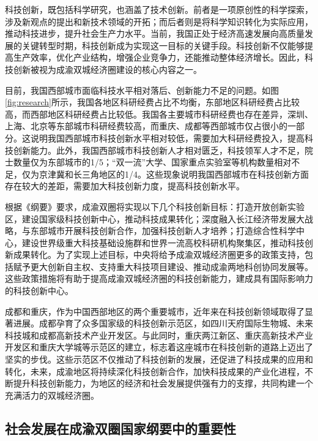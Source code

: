 \documentclass{CjC}
\begin{document}
科技创新，既包括科学研究，也涵盖了技术创新。前者是一项原创性的科学探索，涉及新观点的提出和新技术领域的开拓；而后者则是将科学知识转化为实际应用，推动科技进步，提升社会生产力水平。当前，我国正处于经济高速发展向高质量发展的关键转型时期，科技创新成为实现这一目标的关键手段。科技创新不仅能够提高生产效率，优化产业结构，增强企业竞争力，还能推动整体经济增长。因此，科技创新被视为成渝双城经济圈建设的核心内容之一。

目前，我国西部城市面临科技水平相对落后、创新能力不足的问题\cite{游光荣2001我国地区科技竞争力研究,郭新艳2004基于}。如图\ref{fig:research}所示，我国各地区科研经费占比不均衡，东部地区科研经费占比较高，而西部地区科研经费占比较低。我国各主要城市科研经费也存在差异，深圳、上海、北京等东部城市科研经费较高，而重庆、成都等西部城市仅占很小的一部分。这说明我国西部城市科技创新水平相对较低，需要加大科研经费投入，提高科技创新能力。此外，我国西部城市科技创新人才相对匮乏，科技领军人才不足，院士数量仅为东部城市的1/5；“双一流”大学、国家重点实验室等机构数量相对不足，仅为京津冀和长三角地区的1/4\cite{冯静颖2006西部科技人才开发的问题与对策}。这些现象说明我国西部城市在科技创新方面存在较大的差距，需要加大科技创新力度，提高科技创新水平。

根据《纲要》要求，成渝双圈将实现以下几个科技创新目标：打造开放创新实验区，建设国家级科技创新中心，推动科技成果转化；深度融入长江经济带发展大战略，与东部城市开展科技创新合作，加强科技创新人才培养；打造综合性科学中心，建设世界级重大科技基础设施群和世界一流高校科研机构聚集区，推动科技创新成果转化。为了实现上述目标，中央将给予成渝双城经济圈更多的政策支持，包括赋予更大创新自主权、支持重大科技项目建设、推动成渝两地科创协同发展等。这些政策措施将有助于提高成渝双城经济圈的科技创新能力，建成具有国际影响力的科技创新中心。

成都和重庆，作为中国西部地区的两个重要城市，近年来在科技创新领域取得了显著进展。成都孕育了众多国家级的科技创新示范区，如四川天府国际生物城、未来科技城和成都高新技术产业开发区。与此同时，重庆两江新区、重庆高新技术产业开发区和重庆大学城等示范区的建立，标志着这座城市在科技创新的道路上迈出了坚实的步伐。这些示范区不仅推动了科技创新的发展，还促进了科技成果的应用和转化，未来，成渝地区将持续深化科技创新合作，加快科技成果的产业化进程，不断提升科技创新能力，为地区的经济和社会发展提供强有力的支撑，共同构建一个充满活力的双城经济圈。

\subsection{社会发展在成渝双圈国家纲要中的重要性}
\end{document}
